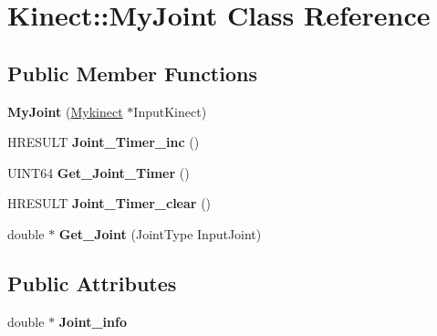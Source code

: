 \hypertarget{class_kinect_1_1_my_joint}{}\section{Kinect\+:\+:My\+Joint Class Reference}
\label{class_kinect_1_1_my_joint}
\subsection*{Public Member Functions}
\begin{DoxyCompactItemize}
\item 
\mbox{\label{class_kinect_1_1_my_joint_a63671d86b2040097aa0fcf15fe5ce517}} 
{\bfseries My\+Joint} (\hyperlink{class_kinect_1_1_mykinect}{Mykinect} $\ast$Input\+Kinect)
\item 
\mbox{\label{class_kinect_1_1_my_joint_a2104d9ca5e1342fe032f95c1c5bc680a}} 
H\+R\+E\+S\+U\+LT {\bfseries Joint\+\_\+\+Timer\+\_\+inc} ()
\item 
\mbox{\label{class_kinect_1_1_my_joint_ab77baf305b50e84be242386d9c5ed63d}} 
U\+I\+N\+T64 {\bfseries Get\+\_\+\+Joint\+\_\+\+Timer} ()
\item 
\mbox{\label{class_kinect_1_1_my_joint_abad2905d34ca81a1df366a9a6d2f8d1b}} 
H\+R\+E\+S\+U\+LT {\bfseries Joint\+\_\+\+Timer\+\_\+clear} ()
\item 
\mbox{\label{class_kinect_1_1_my_joint_a766913c26fbdd58899a59b1cd8d8d2c5}} 
double $\ast$ {\bfseries Get\+\_\+\+Joint} (Joint\+Type Input\+Joint)
\end{DoxyCompactItemize}
\subsection*{Public Attributes}
\begin{DoxyCompactItemize}
\item 
\mbox{\label{class_kinect_1_1_my_joint_ac0b4ceedabfc5838a72532ff811ba2a7}} 
double $\ast$ {\bfseries Joint\+\_\+info}
\end{DoxyCompactItemize}
